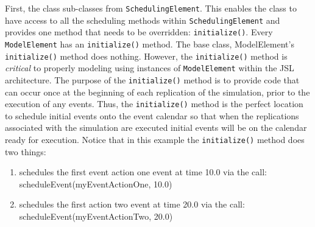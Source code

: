 \documentclass[
]{book}
\providecommand{\tightlist}{%
  \setlength{\itemsep}{0pt}\setlength{\parskip}{0pt}}
\theoremstyle{definition}
\theoremstyle{definition}
\theoremstyle{definition}
\theoremstyle{definition}
\theoremstyle{remark}
\begin{document}
First, the class sub-classes from \texttt{SchedulingElement}. This
enables the class to have access to all the scheduling methods within
\texttt{SchedulingElement} and provides one method that needs to be overridden:
\texttt{initialize()}. Every \texttt{ModelElement} has an \texttt{initialize()}
method. The base class, ModelElement's \texttt{initialize()} method does nothing.
However, the \texttt{initialize()} method is \emph{critical} to properly modeling
using instances of \texttt{ModelElement} within the JSL architecture. The purpose of the
\texttt{initialize()} method is to provide code that can occur once at the
beginning of each replication of the simulation, prior to the execution
of any events. Thus, the \texttt{initialize()} method is the perfect location to
schedule initial events onto the event calendar so that when the
replications associated with the simulation are executed initial events
will be on the calendar ready for execution. Notice that in this example
the \texttt{initialize()} method does two things:

\begin{enumerate}
\def\labelenumi{\arabic{enumi}.}
\tightlist
\item
  schedules the first event action one event at time 10.0 via the call:
  scheduleEvent(myEventActionOne, 10.0)
\item
  schedules the first action two event at time 20.0 via the call:
  scheduleEvent(myEventActionTwo, 20.0)
\end{enumerate}
\end{document}
